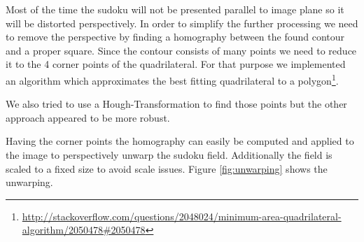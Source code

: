 \documentclass[
a4paper,     %
12pt         %
]{scrartcl}  %
\begin{document}
Most of the time the sudoku will not be presented parallel to image plane so
it will be distorted perspectively. In order to simplify the further processing
we need to remove the perspective by finding a homography between the found
contour and a proper square. Since the contour consists of many points we need
to reduce it to the 4 corner points of the quadrilateral. For that purpose we
implemented an algorithm which approximates
the best fitting quadrilateral to a polygon\footnote{\url{http://stackoverflow.com/questions/2048024/minimum-area-quadrilateral-algorithm/2050478\#2050478}}.

We also tried to use a Hough-Transformation to find those points but the
other approach appeared to be more robust.

Having the corner points the homography can easily be computed and applied
to the image to perspectively unwarp the sudoku field. Additionally the field
is scaled to a fixed size to avoid scale issues. Figure \ref{fig:unwarping}
shows the unwarping.
\end{document}
